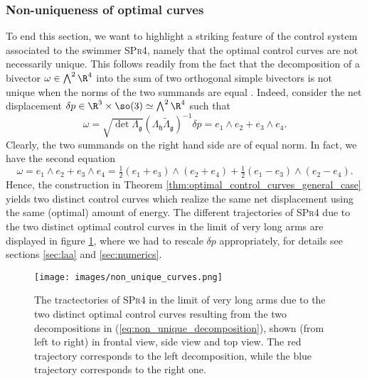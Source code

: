 \subsubsection{Non-uniqueness of optimal curves}
\label{subsec:non_uniqueness}
To end this section, we want to highlight a striking feature of the control system associated to the swimmer \textsc{SPr4}, namely that the optimal control curves are not necessarily unique. This follows readily from the fact that the decomposition of a bivector $\omega \in \bigwedge^2 \R^4$ into the sum of two orthogonal simple bivectors is not unique when the norms of the two summands are equal \cite{Lounesto2006}. Indeed, consider the net displacement $\delta p \in \R^3 \times \so(3) \simeq \bigwedge^2 \R^4$ such that
\begin{equation}
    \omega =  \sqrt{\det \Lambda_{\mathfrak{g}}}(\Lambda_{\mathfrak{h}} \tilde{\Lambda}_{\mathfrak{g}})^{-1} \delta p = e_1 \wedge e_2 + e_3 \wedge e_4.
\end{equation}
Clearly, the two summands on the right hand side are of equal norm. In fact, we have the second equation
\begin{equation}
\label{eq:non_unique_decomposition}
    \omega = e_1 \wedge e_2 + e_3 \wedge e_4 = \tfrac{1}{2}(e_1 + e_3) \wedge (e_2 + e_4) + \tfrac{1}{2}(e_1 - e_3)\wedge(e_2 - e_4).
\end{equation}
Hence, the construction in Theorem \ref{thm:optimal_control_curves_general_case} yields two distinct control curves which realize the same net displacement using the same (optimal) amount of energy. The different trajectories of \textsc{SPr4} due to the two distinct optimal control curves in the limit of very long arms are displayed in figure \ref{fig:non_unique_curves}, where we had to rescale $\delta p$ appropriately, for details see sections \ref{sec:laa} and \ref{sec:numerics}.
\begin{figure}[h]
    \centering
    \texttt{[image: images/non\_unique\_curves.png]}
    \caption{The tractectories of \textsc{SPr4} in the limit of very long arms due to the two distinct optimal control curves resulting from the two decompositions in (\ref{eq:non_unique_decomposition}), shown (from left to right) in frontal view, side view and top view. The red trajectory corresponds to the left decomposition, while the blue trajectory corresponds to the right one.}
    \label{fig:non_unique_curves}
\end{figure}



